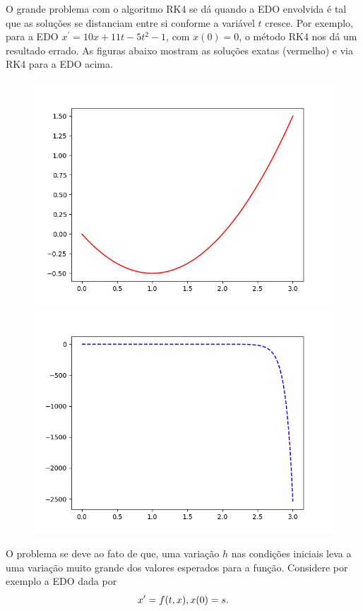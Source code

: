   O grande problema com o algoritmo RK4 se dá quando a EDO envolvida é tal que as soluções se distanciam entre si conforme a variável $t$ cresce. Por exemplo, para a EDO $x^\prime = 10x + 11 t - 5t^2 - 1 $, com $x(0) = 0$, o método RK4 nos dá um resultado errado. As figuras abaixo mostram as soluções exatas (vermelho) e via RK4 para a EDO acima.
  \begin{figure}[h]
    \center
    \includegraphics[scale = .45]{Figure1}
    \includegraphics[scale = .45]{Figure2}
  \end{figure}

  O problema se deve ao fato de que, uma variação $h$ nas condições iniciais leva a uma variação muito grande dos valores esperados para a função. Considere por exemplo a EDO dada por
  \begin{equation*}
    x^\prime = f(t, x), \\
    x(0) = s.
  \end{equation*}


